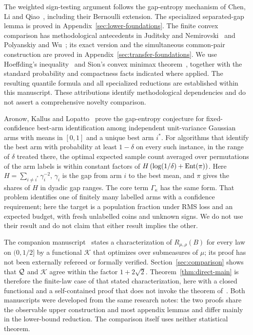The weighted sign-testing argument follows the gap-entropy
mechanism of Chen, Li and Qiao~\cite{clq}, including their
Bernoulli extension. The specialized separated-gap lemma is
proved in Appendix~\ref{sec:lower-foundations}. The finite
convex comparison has methodological antecedents in
Juditsky and Nemirovski~\cite{jn} and Polyanskiy and Wu~\cite{pw};
its exact version and the simultaneous common-pair construction
are proved in Appendix~\ref{sec:transfer-foundations}.
We use Hoeffding's inequality~\cite{hoeffding} and Sion's convex
minimax theorem~\cite{sion}, together with the standard probability
and compactness facts indicated where applied. The resulting
quantile formula and all specialized reductions are established
within this manuscript. These attributions identify methodological
dependencies and do not assert a comprehensive novelty comparison.

Aronow, Kallus and Lopatto~\cite{akl} prove the gap-entropy
conjecture for fixed-confidence best-arm identification among
independent unit-variance Gaussian arms with means in $[0,1]$ and a
unique best arm $i^*$. For algorithms that identify the best arm with
probability at least $1-\delta$ on every such instance, in the range
of $\delta$ treated there, the optimal expected sample count averaged
over permutations of the arm labels is within constant factors of
$H\,(\log(1/\delta)+\operatorname{Ent}(\pi))$. Here $H=\sum_{i\ne i^*}\gamma_i^{-2}$,
$\gamma_i$ is the gap from arm $i$ to the best mean, and $\pi$ gives
the shares of $H$ in dyadic gap ranges. The core term
$\Gamma_\kappa$ has the same form. That problem identifies one of
finitely many labelled arms with a confidence requirement; here the
target is a population fraction under RMS loss and an expected
budget, with fresh unlabelled coins and unknown signs. We do not use
their result and do not claim that either result implies the other.

The companion manuscript~\cite{gl} states a characterization of
$R_{\mu,\rho}(B)$ for every law on $(0,1/2]$ by a functional
$\mathcal K$ that optimizes over submeasures of $\mu$; its proof has
not been externally refereed or formally verified.
Section~\ref{sec:comparison} shows that $\mathcal Q$ and $\mathcal K$ agree
within the factor $1+2\sqrt2$. Theorem~\ref{thm:direct-main} is
therefore the finite-law case of that stated characterization, here
with a closed functional and a self-contained proof that does not
invoke the theorem of~\cite{gl}. Both manuscripts were developed from
the same research notes: the two proofs share the observable upper
construction and most appendix lemmas and differ mainly in the
lower-bound reduction. The comparison itself uses neither statistical
theorem.


